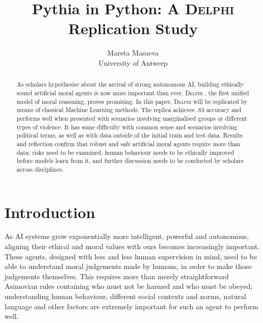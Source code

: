 \documentclass[final]{clv3} %
\title{Pythia in Python: A \textsc{Delphi} Replication Study}
\author{Mareta Masaeva \\ University of Antwerp}
\begin{document}


\newpage



\clearpage



\maketitle %

\begin{abstract}
As scholars hypothesise about the arrival of strong autonomous AI, building ethically sound artificial moral agents is now more important than ever. \textsc{Delphi} \cite{jiang}, the first unified model of moral reasoning, proves promising. In this paper, \textsc{Delphi} will be replicated by means of classical Machine Learning methods. The replica achieves .83 accuracy and performs well when presented with scenarios involving marginalised groups or different types of violence. It has some difficulty with common sense and scenarios involving political terms, as well as with data outside of the initial train and test data. Results and reflection confirm that robust and safe artificial moral agents require more than data; risks need to be examined, human behaviour needs to be ethically improved before models learn from it, and further discussion needs to be conducted by scholars across disciplines. 
\end{abstract}

\section{Introduction} \label{sec:intro}
As AI systems grow exponentially more intelligent, powerful and autonomous, aligning their ethical and moral values with ours becomes increasingly important. These agents, designed with less and less human supervision in mind, need to be able to understand moral judgements made by humans, in order to make those judgements themselves. This requires more than merely straightforward Asimovian \cite{asimov} rules containing who must not be harmed and who must be obeyed; understanding human behaviour, different social contexts and norms, natural language and other factors are extremely important for such an agent to perform well.\\
\end{document}
